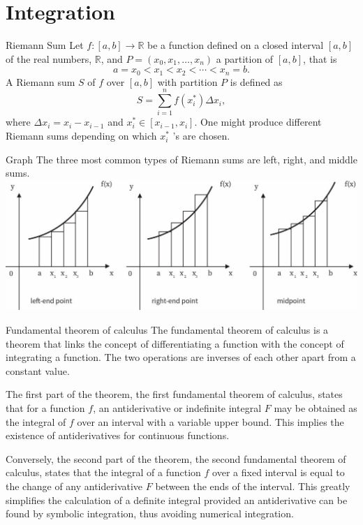 \documentclass{beamer}
\begin{document}
\section{Integration}
\begin{frame}{Riemann Sum}
    Let $f:[a, b] \rightarrow \mathbb{R}$ be a function defined on a closed interval $[a, b]$ of the real numbers, $\mathbb{R}$, and $P=\left(x_0, x_1, \ldots, x_n\right)$ a partition of $[a, b]$, that is
$$
a=x_0<x_1<x_2<\cdots<x_n=b .
$$
A Riemann sum $S$ of $f$ over $[a, b]$ with partition $P$ is defined as
$$
S=\sum_{i=1}^n f\left(x_i^*\right) \Delta x_i,
$$
where $\Delta x_i=x_i-x_{i-1}$ and $x_i^* \in\left[x_{i-1}, x_i\right]$. One might produce different Riemann sums depending on which $x_i^*$ 's are chosen.
\end{frame}

\begin{frame}{Graph}
    The three most common types of Riemann sums are left, right, and middle sums.\\
    \includegraphics[width=\textwidth]{Example/assets/1.jpg}
\end{frame}

\begin{frame}{Fundamental theorem of calculus}
The fundamental theorem of calculus is a theorem that links the concept of differentiating a function with the concept of integrating a function. The two operations are inverses of each other apart from a constant value.

The first part of the theorem, the first fundamental theorem of calculus, states that for a function $f$, an antiderivative or indefinite integral $F$ may be obtained as the integral of $f$ over an interval with a variable upper bound. This implies the existence of antiderivatives for continuous functions.

Conversely, the second part of the theorem, the second fundamental theorem of calculus, states that the integral of a function $f$ over a fixed interval is equal to the change of any antiderivative $F$ between the ends of the interval. This greatly simplifies the calculation of a definite integral provided an antiderivative can be found by symbolic integration, thus avoiding numerical integration.
\end{frame}
\end{document}
